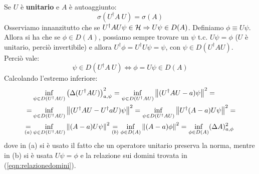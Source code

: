 \documentclass[../../FisicaTeorica.tex]{subfiles}
\begin{document}
\begin{enumerate}
	Se $U$ è \textbf{unitario} e $A$ è autoaggiunto:
	\[
	\sigma \left(U^\dag A\ U\right)= \sigma \left(A\right)
	\]
	Osserviamo innanzitutto che se $U^\dag A U\psi \in \mathcal{H} \Rightarrow U\psi \in D(A)$. Definiamo $\phi \equiv U\psi$.\\
	Allora si ha che se $\phi \in D\left(A\right)$, possiamo sempre trovare un $\psi$ t.c. $U\psi =\phi$ ($U$ è unitario, perciò invertibile) e allora $U^\dag\phi =U^\dag U \psi =\psi$, con $\psi \in D(U^\dag A U)$.\\
	Perciò vale:
	\begin{equation}
	    \psi \in D\left(U^\dag A\ U\right)\Leftrightarrow \phi =U\psi \in D(A)
	    \label{eqn:relazionedomini}
	\end{equation}
	Calcolando l'estremo inferiore:
	\begin{align*}
	   &\inf_{\psi \in D(U^\dag A U)} \left (\Delta(U^\dag A U) \right )^2_{a,\psi}
	   =\inf_{\psi \in D(U^\dagger A U)} \left\lVert(U^\dag A U-a)\psi\right\rVert^2 =\\
	   = &\inf_{\psi \in D(U^\dag A U)} \left\lVert(U^\dag A U - U^\dag a U)\psi\right\rVert^2 = \inf_{\psi \in D(U^\dagger A U)} \left\lVert U^\dag(A-a)U\psi\right\rVert^2 =\\
	   \underset{(a)}{=} &\inf_{\psi \in D(U^\dagger A U)} \left\lVert(A-a)U\psi\right\rVert^2 \underset{(b)}{=} \inf_{\phi \in D(A)} \left\lVert(A-a)\phi\right\rVert^2 = \inf_{\phi \in D(A)} (\Delta A)^2_{a,\phi}
	\end{align*}
	dove in (a) si è usato il fatto che un operatore unitario preserva la norma, mentre in (b) si è usata $U\psi = \phi$ e la relazione sui domini trovata in (\ref{eqn:relazionedomini}).
	

\end{enumerate}
\end{document}
